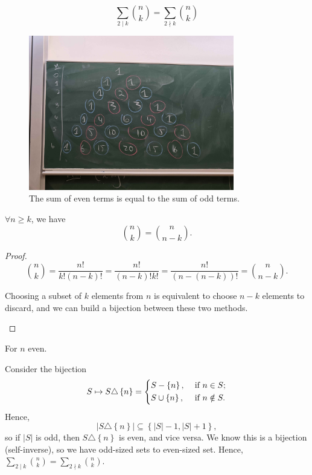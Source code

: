 \begin{corollary}
    \[
        \sum_{2 \mid k} \binom{n}{k} = \sum_{2 \nmid k} \binom{n}{k}  
    \]
\end{corollary}
\begin{figure}[H]
    \centering
    \includegraphics[width=0.8\textwidth]{./Figures/20250909_161713.jpg}
    \caption{The sum of even terms is equal to the sum of odd terms.}
    \label{fig:binomial term even odd relation}
\end{figure}

\begin{theorem}
    \(\forall n \ge k\), we have 
    \[
        \binom{n}{k} = \binom{n}{n-k}.
    \] 
\end{theorem}
\begin{proof}
    \[
        \binom{n}{k}=\frac{n!}{k!(n-k)!} = \frac{n!}{(n-k)!k!} = \frac{n!}{(n - (n-k))!}=\binom{n}{n-k}.
    \]
    \begin{remark}
        Choosing a subset of \(k\) elements from \(n\) is equivalent to choose \(n-k\) elements to discard, and we can build a bijection between these two methods.    
    \end{remark}
\end{proof}

For \(n\) even. 

Consider the bijection 
\[
    S \mapsto S \triangle \left\{ n \right\} = \begin{dcases}
       S - \left\{ n \right\}  , &\text{ if } n \in S  ;\\
       S \cup \left\{ n \right\}  , &\text{ if } n \notin S.
    \end{dcases} 
\]
Hence, 
\[
    \vert S \triangle \left\{ n \right\}  \vert \subseteq \left\{ \vert S \vert - 1, \vert S \vert + 1   \right\},   
\] so if \(\vert S \vert \) is odd, then \(S \triangle \left\{ n \right\} \) is even, and vice versa. We know this is a bijection (self-inverse), so we have odd-sized sets to even-sized set. Hence, \(\sum_{2 \mid k} \binom{n}{k} = \sum_{2 \nmid k} \binom{n}{k}  \). 

